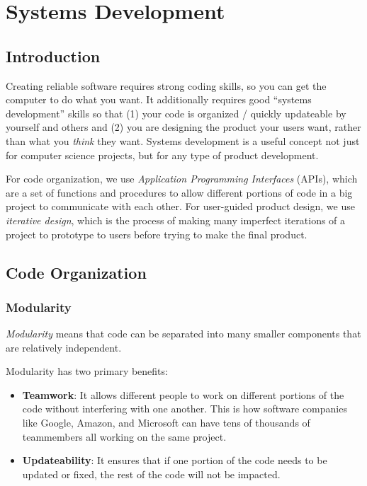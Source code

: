 \chapter{Systems Development}

\section{Introduction}
Creating reliable software requires strong coding skills, so you can get the
computer to do what you want. It additionally requires good ``systems development'' skills so that (1) your code is organized / quickly updateable by yourself and others and (2) you are designing the product your users want, rather than what you \emph{think} they want. Systems development is a useful concept not just for computer science projects, but for any type of product development. 

For code organization, we use \emph{Application Programming Interfaces} (APIs), which are a set of functions and procedures to allow different portions of code in a big project to communicate with each other. For user-guided product design, we use \emph{iterative design}, which is the process of making many imperfect iterations of a project to prototype to users before trying to make the final product. 

\section{Code Organization}

 \subsection{Modularity}
 \begin{definition}
 \emph{Modularity} means that code can be separated into many smaller components that are relatively independent. 
 \end{definition}
 
Modularity has two primary benefits:
\begin{itemize}
\item \textbf{Teamwork}: It allows different people to work on different portions of the code without interfering with one another. This is how software companies like Google, Amazon, and Microsoft can have tens of thousands of teammembers all working on the same project.
\item \textbf{Updateability}: It ensures that if one portion of the code needs to be updated or fixed, the rest of the code will not be impacted. 
\end{itemize} 

